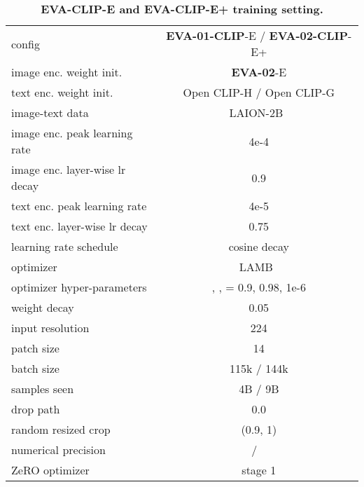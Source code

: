 \documentclass[10pt,twocolumn,letterpaper]{article}
\newcommand{\tablestyle}[2]{\setlength{\tabcolsep}{#1}\renewcommand{\arraystretch}{#2}\centering\footnotesize}
\newcommand{\evared}[1]{\textcolor{eva02red}{#1}}
\newcommand{\evablue}[1]{\textcolor{00blue!80}{#1}}
\newcommand{\eva}{{\textbf{\evared{EVA-02}}}\xspace}
\newcommand{\evaclip}{{\textbf{\evablue{EVA-CLIP}}}\xspace}
\newcommand{\evaOneclip}{{\textbf{\evablue{EVA-01-CLIP}}}\xspace}
\newcommand{\evaTwoclip}{{\textbf{\evablue{EVA-02-CLIP}}}\xspace}
\newcommand{\suptext}[1]{}
\begin{document}
\begin{table}[h]
\centering
\tablestyle{6pt}{1.2}
\scriptsize
\begin{tabular}{l|c}
config & \evaOneclip-E / \evaTwoclip-E+ \\
\shline

image enc. weight init. & \eva-E\\
text enc. weight init. & Open CLIP-H / Open CLIP-G \\

image-text data & LAION-2B~\cite{laion5b} \\

image enc. peak learning rate &  4e-4 \\
image enc. layer-wise lr decay~\cite{clark2020electra, bao2021beit} & 0.9 \\
text enc. peak learning rate &  4e-5 \\
text enc. layer-wise lr decay~\cite{clark2020electra, bao2021beit} & 0.75 \\

learning rate schedule & cosine decay \\

optimizer & LAMB~\cite{lamb} \\
optimizer hyper-parameters & , ,  = 0.9, 0.98, 1e-6 \\
weight decay & 0.05 \\

input resolution & 224\suptext{2} \\
patch size & 14\suptext{2} \\

batch size & 115k / 144k \\
samples seen & 4B / 9B \\

drop path~\cite{huang2016deep} & 0.0 \\
random resized crop & (0.9, 1) \\

numerical precision &   /  ~\cite{rasley2020deepspeed} \\
ZeRO optimizer~\cite{ramesh2021zero} & stage 1 \\

\end{tabular}
\vspace{-.5em}
\caption{\textbf{\evaclip-E and \evaclip-E+ training setting.}}
\label{tab: clip cfg}
\end{table}

{
\fontsize{8.2pt}{9.84pt}\selectfont


}
\end{document}
